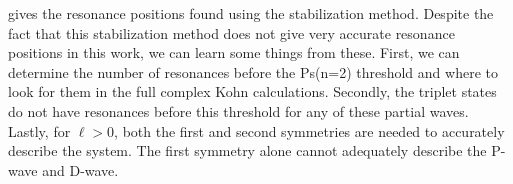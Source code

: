 \documentclass[Dissertation.tex]{subfiles}
\begin{document}
 gives the resonance positions found using the 
stabilization method. Despite the fact that this stabilization method does 
not give very accurate resonance positions in this work, we can learn some 
things from these. First, we can determine the number of resonances before 
the Ps(n=2) threshold and where to look for them in the full complex Kohn 
calculations. Secondly, the triplet states do not have resonances before this 
threshold for any of these partial waves. Lastly, for $\ell > 0$, both the 
first and second symmetries are needed to accurately describe the system. The 
first symmetry alone cannot adequately describe the P-wave and D-wave.



\biblio
\end{document}
